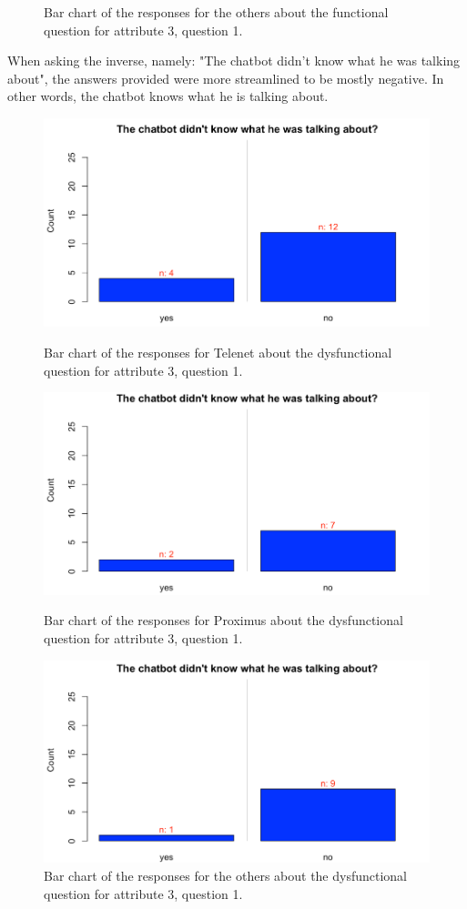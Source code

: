 \begin{figure}[!htb]
	\caption{Bar chart of the responses for the others about the functional question for attribute 3, question 1.}\label{fig:Q3O}
	\endminipage\hfill
\end{figure}
When asking the inverse, namely: "The chatbot didn't know what he was talking about", the answers provided were more streamlined to be mostly negative. In other words, the chatbot knows what he is talking about.\\
\begin{figure}[!htb]
	\includegraphics[width=\linewidth]{../LaTeX/Figures/Comparative/DQ3T.png}
	\caption{Bar chart of the responses for Telenet about the dysfunctional question for attribute 3, question 1.}\label{fig:DQ3T}
	\endminipage\hfill
	\includegraphics[width=\linewidth]{../LaTeX/Figures/Comparative/DQ3P.png}
	\caption{Bar chart of the responses for Proximus about the dysfunctional question for attribute 3, question 1.}\label{fig:DQ3P}
	\endminipage\hfill
	\includegraphics[width=\linewidth]{../LaTeX/Figures/Comparative/DQ3O.png}
	\caption{Bar chart of the responses for the others about the dysfunctional question for attribute 3, question 1.}\label{fig:DQ3O}
	\endminipage\hfill
\end{figure}
